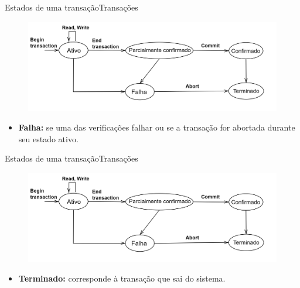 \documentclass[t]{beamer}
\begin{document}

\begin{ftst}{Estados de uma transação}{Transações}
    \begin{figure}
        \centering
        \includegraphics[scale=0.15]{Figuras_transacoes/6.png}
    \end{figure}
    \small
    \begin{itemize}
        \item \textbf{Falha:} se uma das verificações falhar ou se a transação for abortada durante seu estado ativo.
    \end{itemize}
    
\end{ftst}


\begin{ftst}{Estados de uma transação}{Transações}
    \begin{figure}
        \centering
        \includegraphics[scale=0.15]{Figuras_transacoes/6.png}
    \end{figure}
    \small
    \begin{itemize}
        \item \textbf{Terminado:} corresponde à transação que sai do sistema.
    \end{itemize}
    
\end{ftst}

\end{document}
